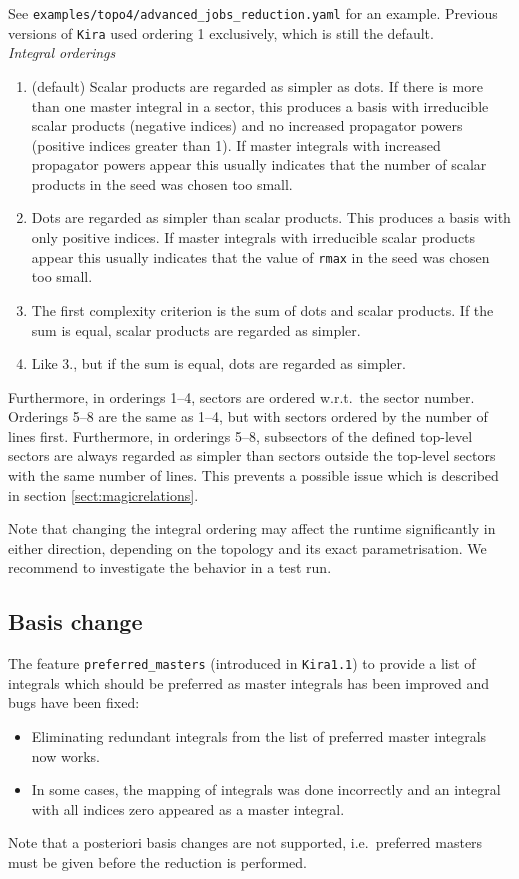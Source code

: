 \documentclass[a4paper,12pt]{article}
\newcommand*{\kira}{\texttt{Kira}}
\begin{document}
See \texttt{examples/topo4/advanced\_jobs\_reduction.yaml} for an example.
Previous versions of \kira{} used ordering 1 exclusively, which is still the
default.
\medskip\\
\noindent
\textit{Integral orderings}
%
\begin{enumerate}
  \item (default) Scalar products are regarded as simpler as dots.
        If there is more than one master integral in a sector, this
        produces a basis with irreducible scalar products (negative indices)
        and no increased propagator powers (positive indices greater than 1).
        If master integrals with increased propagator powers appear this usually
        indicates that the number of scalar products in the seed was chosen too
        small.
  \item Dots are regarded as simpler than scalar products.
        This produces a basis with only positive indices. 
        If master integrals with irreducible scalar products appear this usually
        indicates that the value of \texttt{rmax} in the seed was chosen too
        small.
  \item The first complexity criterion is the sum of dots and scalar products.
        If the sum is equal, scalar products are regarded as simpler.
  \item Like 3., but if the sum is equal, dots are regarded as simpler.
\end{enumerate}
Furthermore, in orderings 1--4, sectors are ordered w.r.t.\ the sector number.
Orderings 5--8 are the same as 1--4, but with sectors ordered by the number of
lines first.
Furthermore, in orderings 5--8, subsectors of the defined top-level sectors are
always regarded as simpler than sectors outside the top-level sectors with the
same number of lines.
This prevents a possible issue which is described in section
\ref{sect:magicrelations}.

Note that changing the integral ordering may affect the runtime significantly in
either direction, depending on the topology and its exact parametrisation.
We recommend to investigate the behavior in a test run.


\subsection{Basis change}

The feature \texttt{preferred\_masters} (introduced in \kira{}\;\texttt{1.1}) to
provide a list of integrals which should be preferred as master integrals has
been improved and bugs have been fixed:
%
\begin{itemize}
  \item Eliminating redundant integrals from the list of preferred master
        integrals now works.
  \item In some cases, the mapping of integrals was done incorrectly and an
        integral with all indices zero appeared as a master integral.
\end{itemize}
Note that a posteriori basis changes are not supported, i.e.\ preferred masters
must be given before the reduction is performed.
\end{document}
